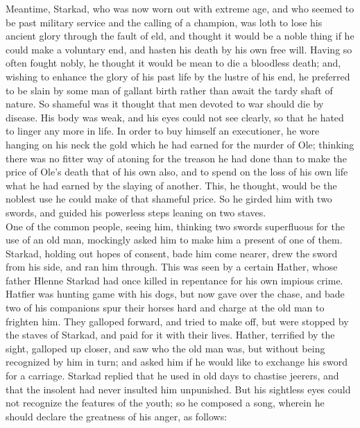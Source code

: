 \documentclass[10pt,a4paper]{report}
\begin{document}
Meantime, Starkad, who was now worn out with extreme age, and who seemed to be past military service and the calling of a champion, was loth to lose his ancient glory through the fault of eld, and thought it would be a noble thing if he could make a voluntary end, and hasten his death by his own free will. Having so often fought nobly, he thought it would be mean to die a bloodless death; and, wishing to enhance the glory of his past life by the lustre of his end, he preferred to be slain by some man of gallant birth rather than await the tardy shaft of nature. So shameful was it thought that men devoted to war should die by disease. His body was weak, and his eyes could not see clearly, so that he hated to linger any more in life. In order to buy himself an executioner, he wore hanging on his neck the gold which he had earned for the murder of Ole; thinking there was no fitter way of atoning for the treason he had done than to make the price of Ole's death that of his own also, and to spend on the loss of his own life what he had earned by the slaying of another. This, he thought, would be the noblest use he could make of that shameful price. So he girded him with two swords, and guided his powerless steps leaning on two staves.\\

One of the common people, seeing him, thinking two swords superfluous for the use of an old man, mockingly asked him to make him a present of one of them. Starkad, holding out hopes of consent, bade him come nearer, drew the sword from his side, and ran him through. This was seen by a certain Hather, whose father Hlenne Starkad had once killed in repentance for his own impious crime. Hatfier was hunting game with his dogs, but now gave over the chase, and bade two of his companions spur their horses hard and charge at the old man to frighten him. They galloped forward, and tried to make off, but were stopped by the staves of Starkad, and paid for it with their lives. Hather, terrified by the sight, galloped up closer, and saw who the old man was, but without being recognized by him in turn; and asked him if he would like to exchange his sword for a carriage. Starkad replied that he used in old days to chastise jeerers, and that the insolent had never insulted him unpunished. But his sightless eyes could not recognize the features of the youth; so he composed a song, wherein he should declare the greatness of his anger, as follows:\\
\end{document}

